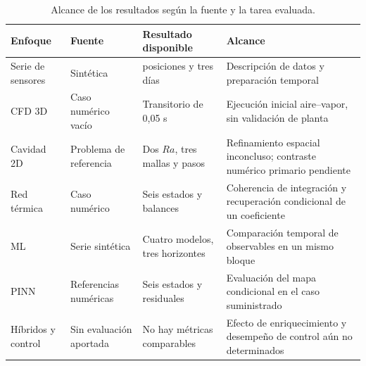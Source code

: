 \begin{table}[htbp]
\centering
\caption{Alcance de los resultados según la fuente y la tarea evaluada.}
\label{tab:res_alcance}
\small
\setlength{\tabcolsep}{5pt}
\begin{tabularx}{\textwidth}{>{\raggedright\arraybackslash}p{1.7cm}>{\raggedright\arraybackslash}p{2.0cm}>{\raggedright\arraybackslash}p{3.0cm}>{\raggedright\arraybackslash}X}
\toprule
Enfoque & Fuente & Resultado disponible & Alcance \\
\midrule
Serie de sensores & Sintética & 36 posiciones y tres días & Descripción de datos y preparación temporal \\
CFD 3D & Caso numérico vacío & Transitorio de 0,05 s & Ejecución inicial aire--vapor, sin validación de planta \\
Cavidad 2D & Problema de referencia & Dos $Ra$, tres mallas y pasos & Refinamiento espacial inconcluso; contraste numérico primario pendiente \\
Red térmica & Caso numérico & Seis estados y balances & Coherencia de integración y recuperación condicional de un coeficiente \\
ML & Serie sintética & Cuatro modelos, tres horizontes & Comparación temporal de observables en un mismo bloque \\
PINN & Referencias numéricas & Seis estados y residuales & Evaluación del mapa condicional en el caso suministrado \\
Híbridos y control & Sin evaluación aportada & No hay métricas comparables & Efecto de enriquecimiento y desempeño de control aún no determinados \\
\bottomrule
\end{tabularx}
\end{table}
